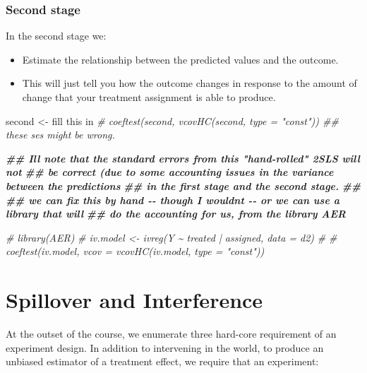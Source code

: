 \documentclass[
]{article}
\newenvironment{Shaded}{\begin{snugshade}}{\end{snugshade}}
\newcommand{\CommentTok}[1]{\textcolor[rgb]{0.56,0.35,0.01}{\textit{#1}}}
\newcommand{\DocumentationTok}[1]{\textcolor[rgb]{0.56,0.35,0.01}{\textbf{\textit{#1}}}}
\newcommand{\NormalTok}[1]{#1}
\newcommand{\OtherTok}[1]{\textcolor[rgb]{0.56,0.35,0.01}{#1}}
\newcommand{\StringTok}[1]{\textcolor[rgb]{0.31,0.60,0.02}{#1}}
\providecommand{\tightlist}{%
  \setlength{\itemsep}{0pt}\setlength{\parskip}{0pt}}
\theoremstyle{definition}
\theoremstyle{definition}
\theoremstyle{definition}
\theoremstyle{definition}
\theoremstyle{remark}
\begin{document}
\subsubsection{Second stage}\label{second-stage}

In the second stage we:

\begin{itemize}
\tightlist
\item
  Estimate the relationship between the predicted values and the outcome.
\item
  This will just tell you how the outcome changes in response to the amount of change that your treatment assignment is able to produce.
\end{itemize}

\begin{Shaded}
\begin{Highlighting}[]
\NormalTok{second }\OtherTok{\textless{}{-}} \StringTok{\textquotesingle{}fill this in\textquotesingle{}}
\CommentTok{\# coeftest(second, vcovHC(second, type = "const")) \#\# these ses might be wrong. }
\end{Highlighting}
\end{Shaded}

\begin{Shaded}
\begin{Highlighting}[]
\DocumentationTok{\#\# I\textquotesingle{}ll note that the standard errors from this "hand{-}rolled" 2SLS will not}
\DocumentationTok{\#\# be correct (due to some accounting issues in the variance between the predictions}
\DocumentationTok{\#\# in the first stage and the second stage.}
\DocumentationTok{\#\#}
\DocumentationTok{\#\# we can fix this by hand {-}{-} though I wouldn\textquotesingle{}t {-}{-} or we can use a library that will}
\DocumentationTok{\#\# do the accounting for us, from the library AER}

\CommentTok{\# library(AER)}
\CommentTok{\# iv.model \textless{}{-} ivreg(Y \textasciitilde{} treated | assigned, data = d2)}
\CommentTok{\# }
\CommentTok{\# coeftest(iv.model, vcov = vcovHC(iv.model, type = "const"))}
\end{Highlighting}
\end{Shaded}

\section{Spillover and Interference}\label{spillover-and-interference}

At the outset of the course, we enumerate three hard-core requirement of an experiment design. In addition to intervening in the world, to produce an unbiased estimator of a treatment effect, we require that an experiment:
\end{document}
